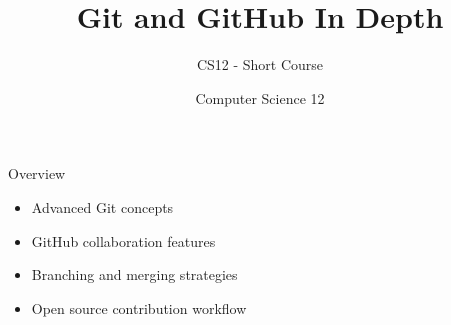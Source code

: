 \documentclass[10pt]{beamer}
\title{Git and GitHub In Depth}
\subtitle{CS12 - Short Course}
\author{Computer Science 12}
\date{}
\begin{document}
\begin{frame}
    \titlepage
\end{frame}

\begin{frame}{Overview}
    \begin{itemize}
        \item Advanced Git concepts
        \item GitHub collaboration features
        \item Branching and merging strategies
        \item Open source contribution workflow
    \end{itemize}
\end{frame}

\end{document}
